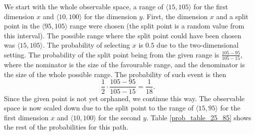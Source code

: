 We start with the whole observable space, a range of $\langle 15, 105\rangle$ for the first dimension $x$ and $\langle 10,100\rangle$ for the dimension $y$.
First, the dimension $x$ and a split point in the $\langle 95, 105\rangle$ range were chosen (the split point is a random value from this interval). The possible range where the split point could have been chosen was $\langle 15,105\rangle$.
The probability of selecting $x$ is $0.5$ due to the two-dimensional setting.
The probability of the split point being from the given range is $\frac{105-95}{105-15}$, where the nominator is the size of the favourable range, and the denominator is the size of the whole possible range.
The probability of such event is then $$\frac{1}{2}\cdot\frac{105-95}{105-15} = \frac{1}{18}.$$
Since the given point is not yet orphaned, we continue this way. The observable space is now scaled down due to the split point to the range of $\langle 15, 95\rangle$ for the first dimension $x$ and $\langle 10,100\rangle$ for the second $y$. Table \ref{prob_table_25_85} shows the rest of the probabilities for this path.


